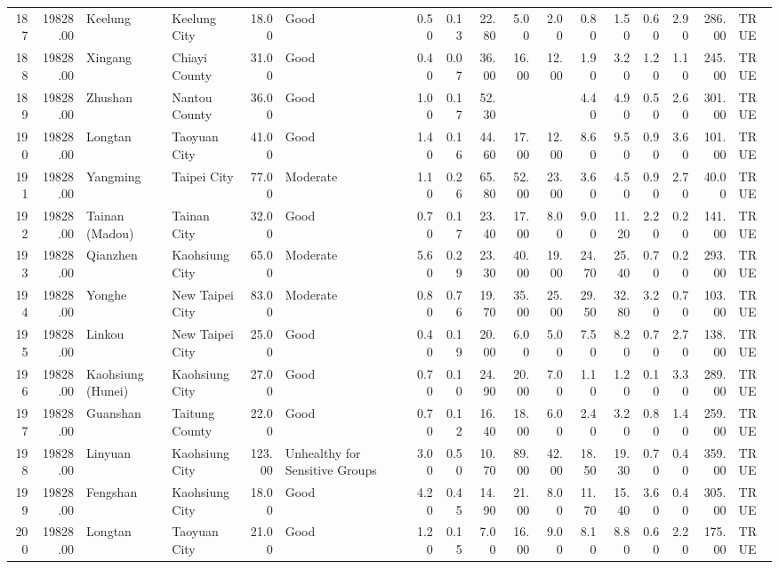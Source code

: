\begin{table}[ht]
\begin{tabular}{rrllrlrrrrrrrrrrl}
  187 & 19828.00 & Keelung & Keelung City & 18.00 & Good & 0.50 & 0.13 & 22.80 & 5.00 & 2.00 & 0.80 & 1.50 & 0.60 & 2.90 & 286.00 & TRUE \\ 
  188 & 19828.00 & Xingang & Chiayi County & 31.00 & Good & 0.40 & 0.07 & 36.00 & 16.00 & 12.00 & 1.90 & 3.20 & 1.20 & 1.10 & 245.00 & TRUE \\ 
  189 & 19828.00 & Zhushan & Nantou County & 36.00 & Good & 1.00 & 0.17 & 52.30 &  &  & 4.40 & 4.90 & 0.50 & 2.60 & 301.00 & TRUE \\ 
  190 & 19828.00 & Longtan & Taoyuan City & 41.00 & Good & 1.40 & 0.16 & 44.60 & 17.00 & 12.00 & 8.60 & 9.50 & 0.90 & 3.60 & 101.00 & TRUE \\ 
  191 & 19828.00 & Yangming & Taipei City & 77.00 & Moderate & 1.10 & 0.26 & 65.80 & 52.00 & 23.00 & 3.60 & 4.50 & 0.90 & 2.70 & 40.00 & TRUE \\ 
  192 & 19828.00 & Tainan (Madou) & Tainan City & 32.00 & Good & 0.70 & 0.17 & 23.40 & 17.00 & 8.00 & 9.00 & 11.20 & 2.20 & 0.20 & 141.00 & TRUE \\ 
  193 & 19828.00 & Qianzhen & Kaohsiung City & 65.00 & Moderate & 5.60 & 0.29 & 23.30 & 40.00 & 19.00 & 24.70 & 25.40 & 0.70 & 0.20 & 293.00 & TRUE \\ 
  194 & 19828.00 & Yonghe & New Taipei City & 83.00 & Moderate & 0.80 & 0.76 & 19.70 & 35.00 & 25.00 & 29.50 & 32.80 & 3.20 & 0.70 & 103.00 & TRUE \\ 
  195 & 19828.00 & Linkou & New Taipei City & 25.00 & Good & 0.40 & 0.19 & 20.00 & 6.00 & 5.00 & 7.50 & 8.20 & 0.70 & 2.70 & 138.00 & TRUE \\ 
  196 & 19828.00 & Kaohsiung (Hunei) & Kaohsiung City & 27.00 & Good & 0.70 & 0.10 & 24.90 & 20.00 & 7.00 & 1.10 & 1.20 & 0.10 & 3.30 & 289.00 & TRUE \\ 
  197 & 19828.00 & Guanshan & Taitung County & 22.00 & Good & 0.70 & 0.12 & 16.40 & 18.00 & 6.00 & 2.40 & 3.20 & 0.80 & 1.40 & 259.00 & TRUE \\ 
  198 & 19828.00 & Linyuan & Kaohsiung City & 123.00 & Unhealthy for Sensitive Groups & 3.00 & 0.50 & 10.70 & 89.00 & 42.00 & 18.50 & 19.30 & 0.70 & 0.40 & 359.00 & TRUE \\ 
  199 & 19828.00 & Fengshan & Kaohsiung City & 18.00 & Good & 4.20 & 0.45 & 14.90 & 21.00 & 8.00 & 11.70 & 15.40 & 3.60 & 0.40 & 305.00 & TRUE \\ 
  200 & 19828.00 & Longtan & Taoyuan City & 21.00 & Good & 1.20 & 0.15 & 7.00 & 16.00 & 9.00 & 8.10 & 8.80 & 0.60 & 2.20 & 175.00 & TRUE \\ 

\end{tabular}
\end{table}
